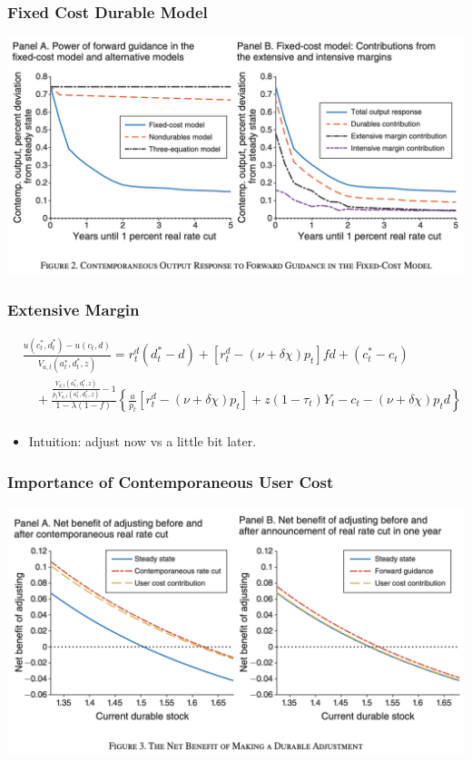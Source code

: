 \documentclass[english,xcolor=svgnames]{beamer}
\begin{document}
\begin{frame}
    \frametitle{Fixed Cost Durable Model}
    \begin{center}
    	\includegraphics[scale=0.3]{figures/MWFGFIG2.png}	
    \end{center}
\end{frame}

\begin{frame}
    \frametitle{Extensive Margin}
    \begin{align*}
&\frac{u(c_t^*,d_t^*)- u(c_t,d)}{V_{a,t}(a_t^*,d_t^*,z)}= 
     r_t^d \left(d_t^*-d\right)
	+ \left[r_t^d - (\nu + \delta \chi)p_t \right]fd +  (c_t^* - c_t)  \\
	&\quad + \frac{\frac{V_{d,t}(a_t^*,d_t^*,z)}{p_t V_{a,t}(a_t^*,d_t^*,z)}-1}{1-\lambda(1-f)} \left\{\frac{a}{p_t}\left[r_t^d - (\nu + \delta \chi)p_t \right] +z (1-\tau_t)Y_t - c_t - (\nu + \delta \chi)p_t d\right\}\\
\end{align*}
\begin{itemize}
	\item Intuition: adjust now vs a little bit later.
\end{itemize}
\end{frame}

\begin{frame}
    \frametitle{Importance of Contemporaneous User Cost}
    \begin{center}
    	\includegraphics[scale=0.3]{figures/MWFGFIG3.png}	
    \end{center}
\end{frame}
\end{document}

